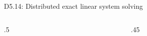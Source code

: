 \documentclass{beamer}
\begin{document}
\begin{frame}
\begin{block} {D5.14: Distributed exact linear system solving}
{\begin{columns}
\begin{column} {.5\textwidth}
\begin{center}
      \end{center}
      \end{column}
      \begin{column} {.45\textwidth}
        \begin{center}
        \end{center}
      \end{column}
    \end{columns}
}
  \end{block}
\end{frame}
\end{document}
